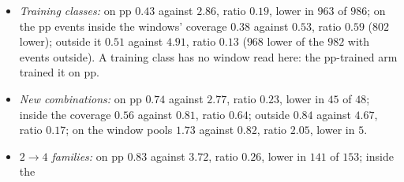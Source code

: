 \documentclass[11pt]{article}
\begin{document}
\begin{itemize}
  \item \emph{Training classes:} on pp $0.43$ against $2.86$, ratio $0.19$, lower in $963$ of $986$; on the pp events
    inside the windows' coverage $0.38$ against $0.53$, ratio $0.59$ ($802$ lower); outside it $0.51$ against $4.91$,
    ratio $0.13$ ($968$ lower of the $982$ with events outside). A training class has no window read here: the
    pp-trained arm trained it on pp.
  \item \emph{New combinations:} on pp $0.74$ against $2.77$, ratio $0.23$, lower in $45$ of $48$; inside the coverage
    $0.56$ against $0.81$, ratio $0.64$; outside $0.84$ against $4.67$, ratio $0.17$; on the window pools $1.73$
    against $0.82$, ratio $2.05$, lower in $5$.
  \item \emph{$2\to4$ families:} on pp $0.83$ against $3.72$, ratio $0.26$, lower in $141$ of $153$; inside the

\end{itemize}
\end{document}
